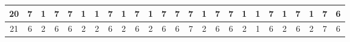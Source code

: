 \begin{sidewaystable}[]
\begin{tabular}{|c|c|c|c|c|c|c|c|c|c|c|c|c|c|c|c|c|c|c|c|c|c|c|c|c|}
    20      & 7                                               & 1                                               & 7                                               & 7                                               & 1                                               & 1                                               & 7                                               & 1                                               & 7                                               & 1                                                & 7                                                & 7                                                & 7                                               & 1                                               & 7                                               & 7                                               & 1                                               & 1                                               & 7                                               & 1                                                 & 7                                               & 1                                                & 7                                                & 6                                                \\ \hline
    21      & 6                                               & 2                                               & 6                                               & 6                                               & 2                                               & 2                                               & 6                                               & 2                                               & 6                                               & 2                                                & 6                                                & 6                                                & 7                                               & 2                                               & 6                                               & 6                                               & 2                                               & 1                                               & 6                                               & 2                                                 & 6                                               & 2                                                & 7                                                & 6                                                \\ \hline

\end{tabular}
\end{sidewaystable}
